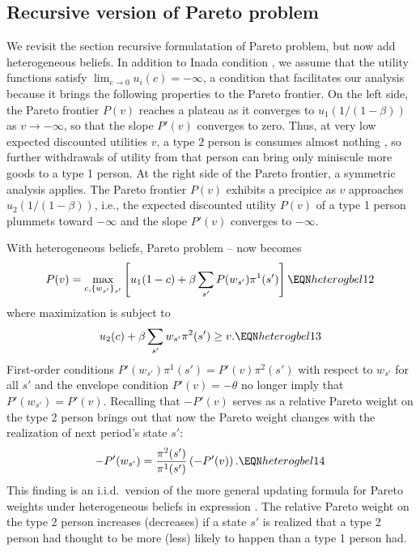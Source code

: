 \subsection{Recursive version of Pareto problem}

 We 
revisit the section  recursive  formulatation of 
Pareto problem, but now add heterogeneous beliefs.
In addition to Inada condition , we 
assume that the utility functions satisfy 
$\lim_{c \rightarrow 0} u_i(c) = -\infty$, a condition that facilitates 
 our analysis because it brings the following 
properties to  the Pareto frontier. On the left 
side, the Pareto frontier $P(v)$ reaches a plateau 
as it converges to $u_1(1/(1-\beta))$ as 
$v \rightarrow -\infty$, so that the  slope $P'(v)$
converges to zero. Thus, at very  low 
expected discounted utilities $v$, a type 2 person
is consumes almost nothing , so further withdrawals of utility from that person can bring  only miniscule
more goods  to
a type 1 person. %
At  
the right side of the Pareto frontier, a symmetric analysis  applies. The Pareto
frontier $P(v)$ exhibits a precipice as $v$ 
approaches $u_2(1/(1-\beta))$, i.e., the expected
discounted utility $P(v)$ of a type 1 person
plummets toward $-\infty$ and the slope $P'(v)$
converges to $-\infty$.

With heterogeneous beliefs,
Pareto problem --
now becomes
$$ P(v) = \max_{c, \{w_{s'} \}_{s'} } \left[ u_1(1-c) 
   + \beta \sum_{s'} P(w_{s'}) \pi^1(s') \right] 
                                      \EQN heterogbel12 $$
where  maximization is subject to
$$ u_2(c) + \beta \sum_{s'} w_{s'} \pi^2(s') \geq v .
                                      \EQN heterogbel13 $$
First-order conditions $P'(w_{s'}) \pi^1(s') =P'(v) \pi^2(s')$  with respect to $w_{s'}$ for all $s'$
and the envelope condition $P'(v) = -\theta$ no longer
imply that $P'(w_{s'})=P'(v)$.  
Recalling  that $-P'(v)$ serves as a relative Pareto weight
on the type 2 person 
brings out that now the Pareto weight changes with
the realization of next period's state $s'$:
$$
-P'(w_{s'})= {\frac{\pi^2(s')}{\pi^1(s')}} 
              \left(-P'(v)\right) .     \EQN heterogbel14 $$
This finding is an i.i.d.\ version of the more general updating formula for  Pareto weights under heterogeneous 
beliefs in expression . 
The relative Pareto weight on the 
type 2 person increases (decreases) if a state $s'$
is realized that a type 2 person had thought
to be more (less) likely to happen than a type 1 person had. 

